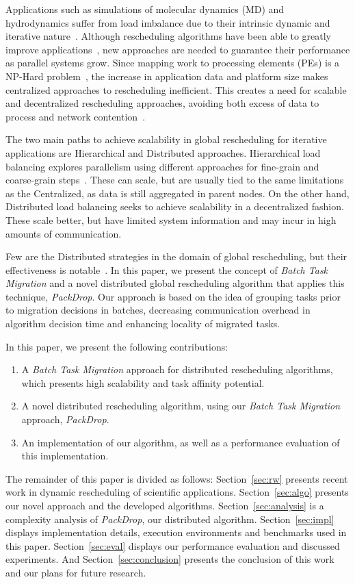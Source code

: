 Applications such as simulations of molecular dynamics (MD) and hydrodynamics suffer from load imbalance due to their intrinsic dynamic and iterative nature~\cite{namd,IPDPS13:LULESH}.
Although rescheduling algorithms have been able to greatly improve applications~\cite{namd0}, new approaches are needed to guarantee their performance as parallel systems grow.
Since mapping work to processing elements (PEs) is a NP-Hard problem~\cite{npcomplete}, the increase in application data and platform size makes centralized approaches to rescheduling inefficient.
This creates a need for scalable and decentralized rescheduling approaches, avoiding both excess of data to process and network contention~\cite{trahay2009scalable}.

The two main paths to achieve scalability in global rescheduling for iterative applications are Hierarchical and Distributed approaches.
Hierarchical load balancing explores parallelism using different approaches for fine-grain and coarse-grain steps~\cite{hybrid}.
These can scale, but are usually tied to the same limitations as the Centralized, as data is still aggregated in parent nodes.
On the other hand, Distributed load balancing seeks to achieve scalability in a decentralized fashion.
These scale better, but have limited system information and may incur in high amounts of communication.

Few are the Distributed strategies in the domain of global rescheduling, but their effectiveness is notable~\cite{grapevine,diffus}.
In this paper, we present the concept of \textit{Batch Task Migration} and a novel distributed global rescheduling algorithm that applies this technique, \textit{PackDrop}.
Our approach is based on the idea of grouping tasks prior to migration decisions in batches, decreasing communication overhead in algorithm decision time and enhancing locality of migrated tasks.

In this paper, we present the following contributions: 
\begin{enumerate}
	\item A \textit{Batch Task Migration} approach for distributed rescheduling algorithms, which presents high scalability and task affinity potential.
	\item A novel distributed rescheduling algorithm, using our \textit{Batch Task Migration} approach, \textit{PackDrop}.
	\item An implementation of our algorithm, as well as a performance evaluation of this implementation.
\end{enumerate}

The remainder of this paper is divided as follows:
Section~\ref{sec:rw} presents recent work in dynamic rescheduling of scientific applications. 
Section~\ref{sec:algo} presents our novel approach and the developed algorithms. 
Section~\ref{sec:analysis} is a complexity analysis of \textit{PackDrop}, our distributed algorithm. 
Section~\ref{sec:impl} displays implementation details, execution environments and benchmarks used in this paper. 
Section~\ref{sec:eval} displays our performance evaluation and discussed experiments. 
And Section~\ref{sec:conclusion} presents the conclusion of this work and our plans for future research.


